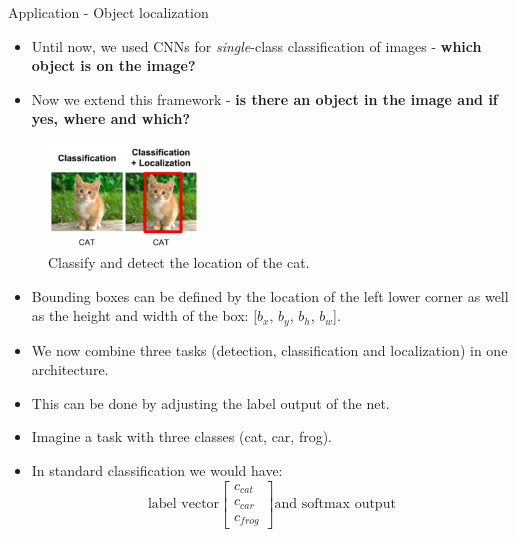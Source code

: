                 \begin{vbframe}{Application - Object localization}
            \begin{itemize}
            \item Until now, we used CNNs for \textit{single}-class classification of images - \textbf{which object is on the image?}
            \item Now we extend this framework - \textbf{is there an object in the image and if yes, where and which?}
            \end{itemize}
            \begin{figure}
            \centering
            \includegraphics[width=4cm]{figure/localize_cat.png}
            \caption{Classify and detect the location of the cat.}
            \end{figure}
            \framebreak
            \begin{itemize}
            \item Bounding boxes can be defined by the location of the left lower corner as well as the height and width of the box: [$b_x$, $b_y$, $b_h$, $b_w$].
            \item We now combine three tasks (detection, classification and localization) in one architecture.
            \item This can be done by adjusting the label output of the net.
            \item Imagine a task with three classes (cat, car, frog).
            \item In standard classification we would have: 
                $$
                \text{label vector}
            \begin{bmatrix}
            c_{cat}\\
            c_{car} \\
            c_{frog}
            \end{bmatrix}
            \text{and softmax output}
$$
\end{itemize}
\end{vbframe}
